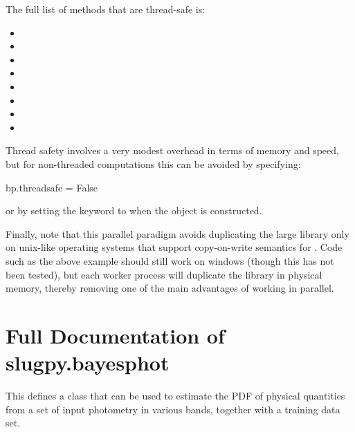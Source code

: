 \documentclass[letterpaper,10pt,english]{sphinxmanual}
\begin{document}
The full list of  methods that are thread-safe is:
\begin{itemize}
\item {} 

\item {} 

\item {} 

\item {} 

\item {} 

\item {} 

\item {} 

\item {} 

\end{itemize}

Thread safety involves a very modest overhead in terms of memory and speed, but for non-threaded computations this can be avoided by specifying:

\begin{sphinxVerbatim}[commandchars=\\\{\}]
bp.thread\PYGZus{}safe = False
\end{sphinxVerbatim}

or by setting the  keyword to  when the 
object is constructed.

Finally, note that this parallel paradigm avoids duplicating the large
library only on unix-like operating systems that support copy-on-write
semantics for . Code such as the
above example should still work on windows (though this has not been
tested), but each worker process will duplicate the library in
physical memory, thereby removing one of the main advantages of
working in parallel.


\section{Full Documentation of slugpy.bayesphot}
\label{\detokenize{bayesphot:full-documentation-of-slugpy-bayesphot}}\label{\detokenize{bayesphot:module-slugpy.bayesphot.bp}}\label{\detokenize{bayesphot:ssec-slugpy-bayesphot}}
This defines a class that can be used to estimate the PDF of physical
quantities from a set of input photometry in various bands, together
with a training data set.
\end{document}
